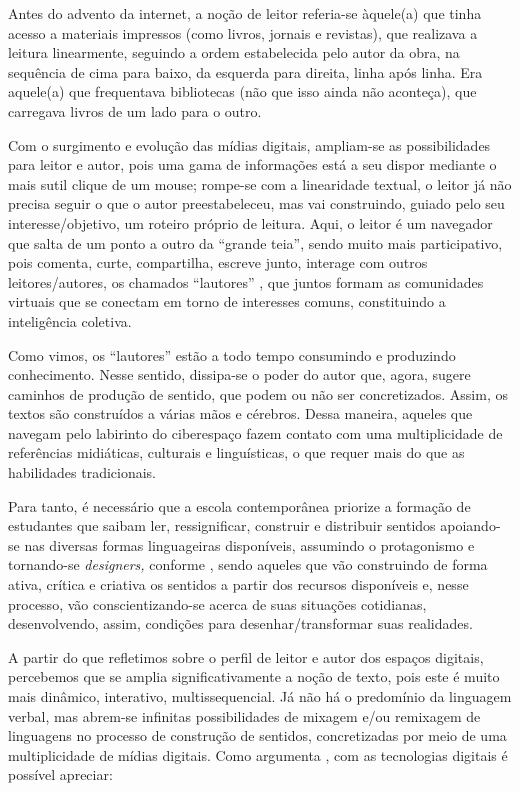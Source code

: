 	Antes do advento da internet, a noção de leitor referia-se àquele(a) que tinha acesso a materiais impressos (como livros, jornais e revistas), que realizava a leitura linearmente, seguindo a ordem estabelecida pelo autor da obra, na sequência de cima para baixo, da esquerda para direita, linha após linha. Era aquele(a) que frequentava bibliotecas (não que isso ainda não aconteça), que carregava livros de um lado para o outro.
	
	Com o surgimento e evolução das mídias digitais, ampliam-se as possibilidades para leitor e autor, pois uma gama de informações está a seu dispor mediante o mais sutil clique de um mouse; rompe-se com a linearidade textual, o leitor já não precisa seguir o que o autor preestabeleceu, mas vai construindo, guiado pelo seu interesse/objetivo, um roteiro próprio de leitura. Aqui, o leitor é um navegador que salta de um ponto a outro da “grande teia”, sendo muito mais participativo, pois comenta, curte, compartilha, escreve junto, interage com outros leitores/autores, os chamados “lautores” \cite[p. 20]{rojo_escola_2013}, que juntos formam as comunidades virtuais que se conectam em torno de interesses comuns, constituindo a inteligência coletiva.
	
	Como vimos, os “lautores” estão a todo tempo consumindo e produzindo conhecimento. Nesse sentido, dissipa-se o poder do autor que, agora, sugere caminhos de produção de sentido, que podem ou não ser concretizados. Assim, os textos são construídos a várias mãos e cérebros. Dessa maneira, aqueles que navegam pelo labirinto do ciberespaço fazem contato com uma multiplicidade de referências midiáticas, culturais e linguísticas, o que requer mais do que as habilidades tradicionais.
	
	Para tanto, é necessário que a escola contemporânea priorize a formação de estudantes que saibam ler, ressignificar, construir e distribuir sentidos apoiando-se nas diversas formas linguageiras disponíveis, assumindo o protagonismo e tornando-se \textit{designers,} conforme \textcite{cope_letramentos_2020}, sendo aqueles que vão construindo de forma ativa, crítica e criativa os sentidos a partir dos recursos disponíveis e, nesse processo, vão conscientizando-se acerca de suas situações cotidianas, desenvolvendo, assim, condições para desenhar/transformar suas realidades.
	
	A partir do que refletimos sobre o perfil de leitor e autor dos espaços digitais, percebemos que se amplia significativamente a noção de texto, pois este é muito mais dinâmico, interativo, multissequencial. Já não há o predomínio da linguagem verbal, mas abrem-se infinitas possibilidades de mixagem e/ou remixagem de linguagens no processo de construção de sentidos, concretizadas por meio de uma multiplicidade de mídias digitais. Como argumenta \textcite[p. 51]{lima_hipertexto:_2016}, com as tecnologias digitais é possível apreciar:
	
